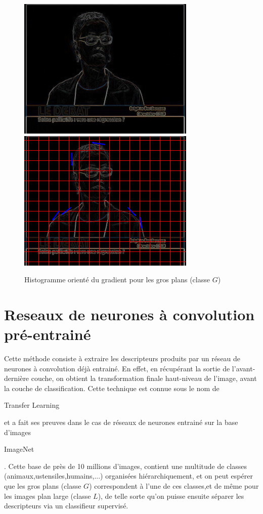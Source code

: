\documentclass{book}
\begin{document}
\begin{figure}[H]
\begin{center}
\includegraphics[scale=0.3]{hog_exemple2_contour.jpg}
\includegraphics[scale=0.3]{hog_exemple2_gradient.jpg}
\end{center}
\caption{Histogramme orienté du gradient pour les gros plans (classe $G$)}
\label{hog_classeG}
\end{figure}

\section{Reseaux de neurones à convolution pré-entrainé}

Cette méthode consiste à extraire les descripteurs produits par un réseau de neurones à convolution déjà entrainé.
En effet, en récupérant la sortie de l'avant-dernière couche, on obtient la transformation finale haut-niveau de l'image, 
avant la couche de classification.
Cette technique est connue sous le nom de \begin{itshape}Transfer Learning\end{itshape} \cite{DBLP:journals/corr/YosinskiCBL14} 
et a fait ses preuves dans le cas de réseaux de neurones entrainé sur la base 
d'images \begin{itshape}ImageNet\end{itshape} \cite{imagenet_cvpr09}.
Cette base de près de 10 millions d'images, contient une multitude de classes (animaux,ustensiles,humains,...) organisées hiérarchiquement, 
et on peut espérer que les gros plans (classe $G$) correspondent à l'une de ces classes,et de même pour les images plan 
large (classe $L$), de telle sorte qu'on puisse ensuite séparer les descripteurs via un classifieur 
supervisé.
\end{document}
